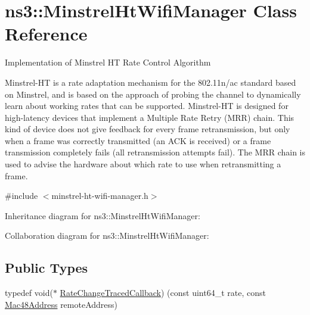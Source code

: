 \hypertarget{classns3_1_1MinstrelHtWifiManager}{}\section{ns3\+:\+:Minstrel\+Ht\+Wifi\+Manager Class Reference}
\label{classns3_1_1MinstrelHtWifiManager}


Implementation of Minstrel HT Rate Control Algorithm

Minstrel-\/\+HT is a rate adaptation mechanism for the 802.\+11n/ac standard based on Minstrel, and is based on the approach of probing the channel to dynamically learn about working rates that can be supported. Minstrel-\/\+HT is designed for high-\/latency devices that implement a Multiple Rate Retry (M\+RR) chain. This kind of device does not give feedback for every frame retransmission, but only when a frame was correctly transmitted (an A\+CK is received) or a frame transmission completely fails (all retransmission attempts fail). The M\+RR chain is used to advise the hardware about which rate to use when retransmitting a frame.  




{\ttfamily \#include $<$minstrel-\/ht-\/wifi-\/manager.\+h$>$}



Inheritance diagram for ns3\+:\+:Minstrel\+Ht\+Wifi\+Manager\+:


Collaboration diagram for ns3\+:\+:Minstrel\+Ht\+Wifi\+Manager\+:
\subsection*{Public Types}
\begin{DoxyCompactItemize}
\item 
typedef void($\ast$ \hyperlink{classns3_1_1MinstrelHtWifiManager_a0374b86124574585310bb1b649479c0e}{Rate\+Change\+Traced\+Callback}) (const uint64\+\_\+t rate, const \hyperlink{classns3_1_1Mac48Address}{Mac48\+Address} remote\+Address)
\end{DoxyCompactItemize}
